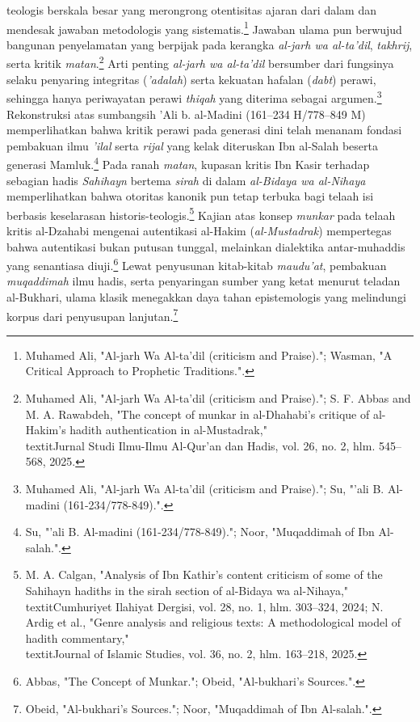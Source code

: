 teologis berskala besar yang merongrong otentisitas ajaran dari dalam dan mendesak jawaban metodologis yang sistematis.\footnote{Muhamed Ali, "Al-jarh Wa Al-ta'dil (criticism and Praise)."; Wasman, "A Critical Approach to Prophetic Traditions.".} Jawaban ulama pun berwujud bangunan penyelamatan yang berpijak pada kerangka \textit{al-jarh wa al-ta'dil}, \textit{takhrij}, serta kritik \textit{matan}.\footnote{Muhamed Ali, "Al-jarh Wa Al-ta'dil (criticism and Praise)."; S. F. Abbas and M. A. Rawabdeh, "The concept of munkar in al-Dhahabi's critique of al-Hakim's hadith authentication in al-Mustadrak," \\textit{Jurnal Studi Ilmu-Ilmu Al-Qur'an dan Hadis}, vol. 26, no. 2, hlm. 545--568, 2025.} Arti penting \textit{al-jarh wa al-ta'dil} bersumber dari fungsinya selaku penyaring integritas (\textit{'adalah}) serta kekuatan hafalan (\textit{dabt}) perawi, sehingga hanya periwayatan perawi \textit{thiqah} yang diterima sebagai argumen.\footnote{Muhamed Ali, "Al-jarh Wa Al-ta'dil (criticism and Praise)."; Su, "'ali B. Al-madini (161-234/778-849).".} Rekonstruksi atas sumbangsih 'Ali b. al-Madini (161--234 H/778--849 M) memperlihatkan bahwa kritik perawi pada generasi dini telah menanam fondasi pembakuan ilmu \textit{'ilal} serta \textit{rijal} yang kelak diteruskan Ibn al-Salah beserta generasi Mamluk.\footnote{Su, "'ali B. Al-madini (161-234/778-849)."; Noor, "Muqaddimah of Ibn Al-salah.".} Pada ranah \textit{matan}, kupasan kritis Ibn Kasir terhadap sebagian hadis \textit{Sahihayn} bertema \textit{sirah} di dalam \textit{al-Bidaya wa al-Nihaya} memperlihatkan bahwa otoritas kanonik pun tetap terbuka bagi telaah isi berbasis keselarasan historis-teologis.\footnote{M. A. Calgan, "Analysis of Ibn Kathir's content criticism of some of the Sahihayn hadiths in the sirah section of al-Bidaya wa al-Nihaya," \\textit{Cumhuriyet Ilahiyat Dergisi}, vol. 28, no. 1, hlm. 303--324, 2024; N. Ardig et al., "Genre analysis and religious texts: A methodological model of hadith commentary," \\textit{Journal of Islamic Studies}, vol. 36, no. 2, hlm. 163--218, 2025.} Kajian atas konsep \textit{munkar} pada telaah kritis al-Dzahabi mengenai autentikasi al-Hakim (\textit{al-Mustadrak}) mempertegas bahwa autentikasi bukan putusan tunggal, melainkan dialektika antar-muhaddis yang senantiasa diuji.\footnote{Abbas, "The Concept of Munkar."; Obeid, "Al-bukhari's Sources.".} Lewat penyusunan kitab-kitab \textit{maudu'at}, pembakuan \textit{muqaddimah} ilmu hadis, serta penyaringan sumber yang ketat menurut teladan al-Bukhari, ulama klasik menegakkan daya tahan epistemologis yang melindungi korpus dari penyusupan lanjutan.\footnote{Obeid, "Al-bukhari's Sources."; Noor, "Muqaddimah of Ibn Al-salah.".}


